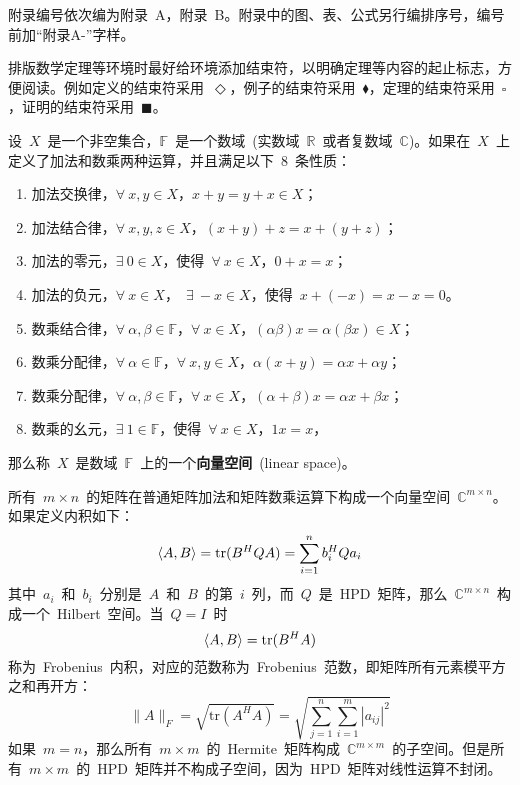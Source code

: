 

附录编号依次编为附录~A，附录~B。附录中的图、表、公式另行编排序号，编号前加“附录A-”字样。

排版数学定理等环境时最好给环境添加结束符，以明确定理等内容的起止标志，方便阅读。例如定义的结束符采用~$\Diamond$，例子的结束符采用~$\blacklozenge$，定理的结束符采用~$\square$，证明的结束符采用~$\blacksquare$。

\begin{definition}[向量空间]
	设~$X$~是一个非空集合，$\mathbb{F}$~是一个数域~(实数域~$\mathbb{R}$~或者复数域~$\mathbb{C}$)。如果在~$X$~上定义了加法和数乘两种运算，并且满足以下~8~条性质：
	\begin{enumerate}
		\item 加法交换律，$\forall~x,y \in X$，$x+y = y+x \in X$；
		\item 加法结合律，$\forall~x,y,z \in X$，$(x+y)+z = x+(y+z)$；
		\item 加法的零元，$\exists~0 \in X$，使得~$\forall~x \in X$，$0+x = x$；
		\item 加法的负元，$\forall~x \in X$，~$\exists~-x \in X$，使得~$x+(-x) = x-x = 0$。
		\item 数乘结合律，$\forall~\alpha,\beta \in \mathbb{F}$，$\forall~x \in X$，$(\alpha\beta)x = \alpha(\beta x) \in X$；
		\item 数乘分配律，$\forall~\alpha \in \mathbb{F}$，$\forall~x,y \in X$，$\alpha(x+y) = \alpha x + \alpha y$；
		\item 数乘分配律，$\forall~\alpha,\beta \in \mathbb{F}$，$\forall~x \in X$，$(\alpha+\beta)x = \alpha x + \beta x$；
		\item 数乘的幺元，$\exists~1 \in \mathbb{F}$，使得~$\forall~x \in X$，$1 x = x$，
	\end{enumerate}
	那么称~$X$~是数域~$\mathbb{F}$~上的一个\textbf{向量空间}~(linear space)。
\end{definition}

\begin{example}[矩阵空间]
	所有~$m\times n$~的矩阵在普通矩阵加法和矩阵数乘运算下构成一个向量空间~$\mathbb{C}^{m\times n}$。如果定义内积如下：
	\begin{equation}
	\langle A,B \rangle = \mathrm{tr}(B^H Q A) = \sum_{i=1}^{n} b_i^H Q a_i
	\end{equation}
	其中~$a_i$~和~$b_i$~分别是~$A$~和~$B$~的第~$i$~列，而~$Q$~是~HPD~矩阵，那么~$\mathbb{C}^{m\times n}$~构成一个~Hilbert~空间。当~$Q=I$~时
	\begin{equation}
	\langle A,B \rangle = \mathrm{tr}(B^H A)
	\end{equation}
	称为~Frobenius~内积，对应的范数称为~Frobenius~范数，即矩阵所有元素模平方之和再开方：
	\begin{equation} \label{equ_chap1_frob_norm}
	\|A\|_F = \sqrt{\mathrm{tr}(A^H A)} = \sqrt{\sum_{j=1}^{n}\sum_{i=1}^{m} |a_{ij}|^2}
	\end{equation}
	如果~$m=n$，那么所有~$m\times m$~的~Hermite~矩阵构成~$\mathbb{C}^{m\times m}$~的子空间。但是所有~$m\times m$~的~HPD~矩阵并不构成子空间，因为~HPD~矩阵对线性运算不封闭。
\end{example}

